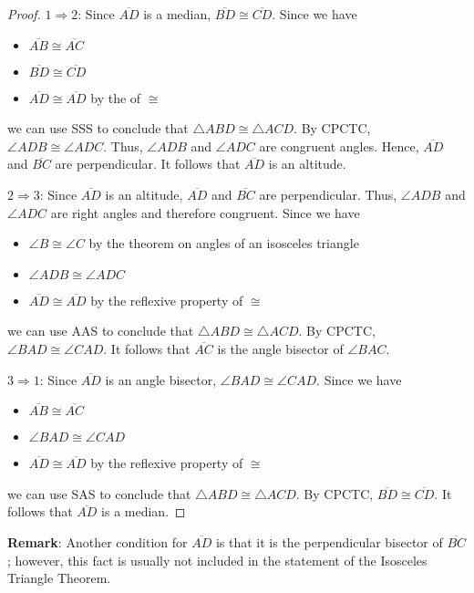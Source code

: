\documentclass[12pt]{article}
\begin{document}
\begin{proof}
$1 \Rightarrow 2$: Since $\overline{AD}$ is a median, $\overline{BD} \cong \overline{CD}$.  Since we have

\begin{itemize}
\item $\overline{AB} \cong \overline{AC}$
\item $\overline{BD} \cong \overline{CD}$
\item $\overline{AD} \cong \overline{AD}$ by the  of $\cong$
\end{itemize}

we can use SSS to conclude that $\triangle ABD \cong \triangle ACD$.  By CPCTC, $\angle ADB \cong \angle ADC$.  Thus, $\angle ADB$ and $\angle ADC$ are  congruent angles.  Hence, $\overline{AD}$ and $\overline{BC}$ are perpendicular.  It follows that $\overline{AD}$ is an altitude.

$2 \Rightarrow 3$:  Since $\overline{AD}$ is an altitude, $\overline{AD}$ and $\overline{BC}$ are perpendicular.  Thus, $\angle ADB$ and $\angle ADC$ are right angles and therefore congruent.  Since we have

\begin{itemize}
\item $\angle B \cong \angle C$ by the theorem on angles of an isosceles triangle
\item $\angle ADB \cong \angle ADC$
\item $\overline{AD} \cong \overline{AD}$ by the reflexive property of $\cong$
\end{itemize}

we can use AAS to conclude that $\triangle ABD \cong \triangle ACD$.  By CPCTC, $\angle BAD \cong \angle CAD$.  It follows that $\overline{AC}$ is the angle bisector of $\angle BAC$.

$3 \Rightarrow 1$:  Since $\overline{AD}$ is an angle bisector, $\angle BAD \cong \angle CAD$.  Since we have

\begin{itemize}
\item $\overline{AB} \cong \overline{AC}$
\item $\angle BAD \cong \angle CAD$
\item $\overline{AD} \cong \overline{AD}$ by the reflexive property of $\cong$
\end{itemize}

we can use SAS to conclude that $\triangle ABD \cong \triangle ACD$.  By CPCTC, $\overline{BD} \cong \overline{CD}$.  It follows that $\overline{AD}$ is a median.
\end{proof}

\textbf{Remark}: Another  condition for $\overline{AD}$ is that it is the perpendicular bisector of $\overline{BC}$; however, this fact is usually not included in the statement of the Isosceles Triangle Theorem.
\end{document}

